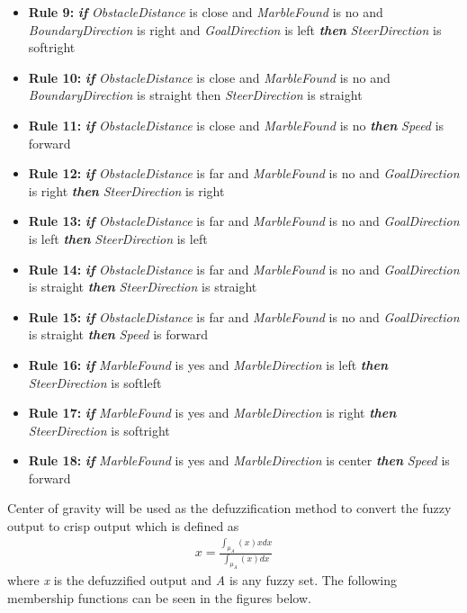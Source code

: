 \documentclass[../Head/Main.tex]{subfiles}
\begin{document}
\begin{itemize}
\item {\large \textbf{Rule 9:}} \textbf{\textit{if}} \textit{ObstacleDistance} is close and \textit{MarbleFound} is no and \textit{BoundaryDirection} is right and \textit{GoalDirection} is left \textbf{\textit{then}} \textit{SteerDirection} is softright
 
\item {\large \textbf{Rule 10:}} \textbf{\textit{if}} \textit{ObstacleDistance} is close and \textit{MarbleFound} is no and \textit{BoundaryDirection} is straight then \textit{SteerDirection} is straight

\item {\large \textbf{Rule 11:}} \textbf{\textit{if}} \textit{ObstacleDistance} is close and \textit{MarbleFound} is no \textbf{\textit{then}} \textit{Speed} is forward

\item {\large \textbf{Rule 12:}} \textbf{\textit{if}} \textit{ObstacleDistance} is far and \textit{MarbleFound} is no and \textit{GoalDirection} is right \textbf{\textit{then}} \textit{SteerDirection} is right

\item {\large \textbf{Rule 13:}} \textbf{\textit{if}} \textit{ObstacleDistance} is far and \textit{MarbleFound} is no and \textit{GoalDirection} is left \textbf{\textit{then}} \textit{SteerDirection} is left

\item {\large \textbf{Rule 14:}} \textbf{\textit{if}} \textit{ObstacleDistance} is far and \textit{MarbleFound} is no and \textit{GoalDirection} is straight \textbf{\textit{then}} \textit{SteerDirection} is straight
 
\item {\large \textbf{Rule 15:}} \textbf{\textit{if}} \textit{ObstacleDistance} is far and \textit{MarbleFound} is no and \textit{GoalDirection} is straight \textbf{\textit{then}} \textit{Speed} is forward

\item {\large \textbf{Rule 16:}} \textbf{\textit{if}} \textit{MarbleFound} is yes and \textit{MarbleDirection} is left \textbf{\textit{then}} \textit{SteerDirection} is softleft

\item {\large \textbf{Rule 17:}} \textbf{\textit{if}} \textit{MarbleFound} is yes and \textit{MarbleDirection} is right \textbf{\textit{then}} \textit{SteerDirection} is softright
 
\item {\large \textbf{Rule 18:}} \textbf{\textit{if}} \textit{MarbleFound} is yes and \textit{MarbleDirection} is center \textbf{\textit{then}} \textit{Speed} is forward
\end{itemize}


Center of gravity will be used as the defuzzification method to convert the fuzzy output to crisp output which is defined as
\begin{align}
 x = \frac{ \int_{\mu_A}(x)xdx }{ \int_{\mu_A} (x) dx }
\end{align}  
where \textit{x} is the defuzzified output and \textit{A} is any fuzzy set. The following membership functions can be seen in the figures below.  
\end{document}
